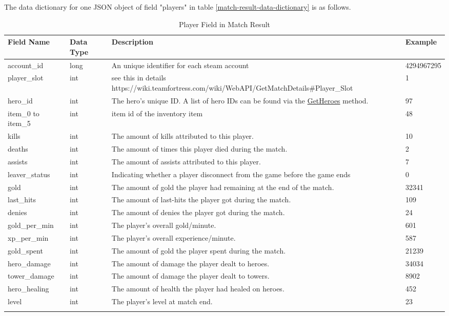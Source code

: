 \documentclass{article}
\begin{document}
The data dictionary for one JSON object of field "players" in table \ref{match-result-data-dictionary} is as follows.

\begin{longtable}{|p{2.5cm}|p{2cm}|p{5.5cm}|p{3cm}|}

\hline
\textbf{Field Name} & \textbf{Data Type} & \textbf{Description}  & \textbf{Example} \\
\hline
\endhead

account\_id & long & An unique identifier for each steam account & 4294967295 \\
\hline
player\_slot & int & see this in details https://wiki.teamfortress.com/wiki/WebAPI/GetMatchDetails\#Player\_Slot & 1 \\
\hline
hero\_id & int & The hero's unique ID. A list of hero IDs can be found via the \href{https://wiki.teamfortress.com/wiki/WebAPI/GetHeroes}{GetHeroes} method. & 97 \\
\hline
item\_0 to item\_5 & int & item id of the inventory item & 48 \\
\hline
kills & int & The amount of kills attributed to this player. & 10 \\
\hline
deaths & int & The amount of times this player died during the match. & 2 \\
\hline
assists & int & The amount of assists attributed to this player. & 7 \\
\hline
leaver\_status & int & Indicating whether a player disconnect from the game before the game ends & 0 \\
\hline
gold & int & The amount of gold the player had remaining at the end of the match. & 32341 \\
\hline
last\_hits & int & The amount of last-hits the player got during the match. & 109 \\
\hline
denies & int & The amount of denies the player got during the match. & 24 \\
\hline
gold\_per\_min & int &  The player's overall gold/minute. & 601 \\
\hline
xp\_per\_min & int & The player's overall experience/minute. & 587 \\
\hline
gold\_spent & int & The amount of gold the player spent during the match. & 21239 \\
\hline
hero\_damage & int & The amount of damage the player dealt to heroes. & 34034 \\
\hline
tower\_damage & int & The amount of damage the player dealt to towers. & 8902 \\
\hline
hero\_healing & int & The amount of health the player had healed on heroes. & 452 \\
\hline
level & int & The player's level at match end. & 23 \\
\hline
\caption{Player Field in Match Result}
\label{player-field-in-match-result}
\end{longtable}
\end{document}

